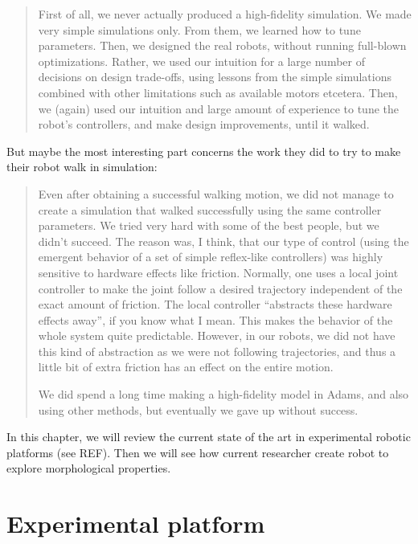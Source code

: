 \begin{quotation}
First of all, we never actually produced a high-fidelity simulation. We made very simple simulations only. From them, we learned how to tune parameters. Then, we designed the real robots, without running full-blown optimizations. Rather, we used our intuition for a large number of decisions on design trade-offs, using lessons from the simple simulations combined with other limitations such as available motors etcetera. Then, we (again) used our intuition and large amount of experience to tune the robot’s controllers, and make design improvements, until it walked.

\end{quotation}

But maybe the most interesting part concerns the work they did to try to make their robot walk in simulation:

\begin{quotation}

Even after obtaining a successful walking motion, we did not manage to create a simulation that walked successfully using the same controller parameters. We tried very hard with some of the best people, but we didn’t succeed. The reason was, I think, that our type of control (using the emergent behavior of a set of simple reflex-like controllers) was highly sensitive to hardware effects like friction. Normally, one uses a local joint controller to make the joint follow a desired trajectory independent of the exact amount of friction. The local controller “abstracts these hardware effects away”, if you know what I mean. This makes the behavior of the whole system quite predictable. However, in our robots, we did not have this kind of abstraction as we were not following trajectories, and thus a little bit of extra friction has an effect on the entire motion.

We did spend a long time making a high-fidelity model in Adams, and also using other methods, but eventually we gave up without success.

\end{quotation}


In this chapter, we will review the current state of the art in experimental robotic platforms (see REF). Then we will see how current researcher create robot to explore morphological properties.

\section{Experimental platform} %

